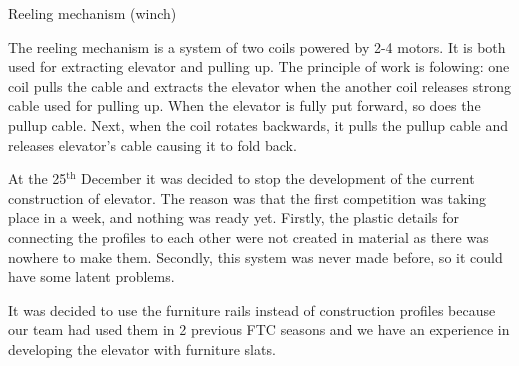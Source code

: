 \begin{enumerate*}
    \item Reeling mechanism (winch)
    \begin{enumerate*}
    	\item The reeling mechanism is a system of two coils powered by 2-4 motors. It is both used for extracting elevator and pulling up. The principle of work is folowing: one coil pulls the cable and extracts the elevator when the another coil releases strong cable used for pulling up. When the elevator is fully put forward, so does the pullup cable. Next, when the coil rotates backwards, it pulls the pullup cable and releases elevator's cable causing it to fold back.
    \end{enumerate*}
  
  \end{enumerate*}	
  
  At the 25$^\text{th}$ December it was decided to stop the development of the current construction of elevator. The reason was that the first competition was taking place in a week, and nothing was ready yet. Firstly, the plastic details for connecting the profiles to each other were not created in material as there was nowhere to make them. Secondly, this system was never made before, so it could have some latent problems.
  
  It was decided to use the furniture rails instead of construction profiles because our team had used them in 2 previous FTC seasons and we have an experience in developing the elevator with furniture slats. 
  
  